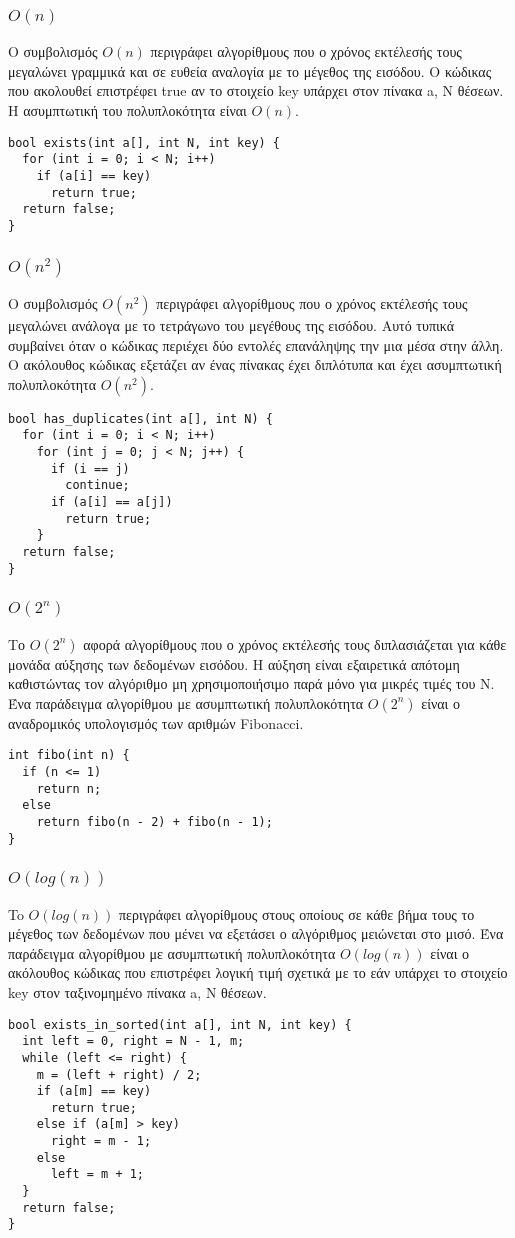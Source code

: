 \subsubsection{$O(n)$}
Ο συμβολισμός $O(n)$ περιγράφει αλγορίθμους που ο χρόνος εκτέλεσής τους  μεγαλώνει γραμμικά και σε ευθεία αναλογία με το μέγεθος της εισόδου. Ο κώδικας που ακολουθεί επιστρέφει true αν το στοιχείο key υπάρχει στον πίνακα a, Ν θέσεων. Η ασυμπτωτική του πολυπλοκότητα είναι $O(n)$.
\begin{lstlisting}
bool exists(int a[], int N, int key) {
  for (int i = 0; i < N; i++)
    if (a[i] == key)
      return true;
  return false;
}
\end{lstlisting}

\subsubsection{$O(n^2)$}
Ο συμβολισμός $O(n^2)$ περιγράφει αλγορίθμους που ο χρόνος εκτέλεσής τους  μεγαλώνει ανάλογα με το τετράγωνο του μεγέθους της εισόδου. Αυτό τυπικά συμβαίνει όταν ο κώδικας περιέχει δύο εντολές επανάληψης την μια μέσα στην άλλη. Ο ακόλουθος κώδικας εξετάζει αν ένας πίνακας έχει διπλότυπα και έχει ασυμπτωτική πολυπλοκότητα $O(n^2)$. 
\begin{lstlisting}
bool has_duplicates(int a[], int N) {
  for (int i = 0; i < N; i++)
    for (int j = 0; j < N; j++) {
      if (i == j)
        continue;
      if (a[i] == a[j])
        return true;
    }
  return false;
}
\end{lstlisting}

\subsubsection{$O(2^n)$}
Το $O(2^n)$ αφορά αλγορίθμους που ο χρόνος εκτέλεσής τους διπλασιάζεται για κάθε μονάδα αύξησης των δεδομένων εισόδου. Η αύξηση είναι εξαιρετικά απότομη καθιστώντας τον αλγόριθμο μη χρησιμοποιήσιμο παρά μόνο για μικρές τιμές του Ν. Ένα παράδειγμα αλγορίθμου με ασυμπτωτική πολυπλοκότητα $O(2^n)$ είναι ο αναδρομικός υπολογισμός των αριθμών Fibonacci. 
\begin{lstlisting}
int fibo(int n) {
  if (n <= 1)
    return n;
  else
    return fibo(n - 2) + fibo(n - 1);
}
\end{lstlisting}

\subsubsection{$O(log(n))$}
To $O(log(n))$ περιγράφει αλγορίθμους στους οποίους σε κάθε βήμα τους το μέγεθος των δεδομένων που μένει να εξετάσει ο αλγόριθμος μειώνεται στο μισό. Ένα παράδειγμα αλγορίθμου με ασυμπτωτική πολυπλοκότητα $O(log(n))$ είναι ο ακόλουθος κώδικας που επιστρέφει λογική τιμή σχετικά με το εάν υπάρχει το στοιχείο key στον ταξινομημένο πίνακα a, N θέσεων.
\begin{lstlisting}
bool exists_in_sorted(int a[], int N, int key) {
  int left = 0, right = N - 1, m;
  while (left <= right) {
    m = (left + right) / 2;
    if (a[m] == key)
      return true;
    else if (a[m] > key)
      right = m - 1;
    else
      left = m + 1;
  }
  return false;
}
\end{lstlisting}

